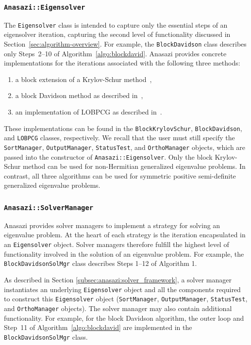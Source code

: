 \documentclass[acmtoms,acmnow]{acmtrans2m}
\newcommand{\aspace}[1]{\texttt{#1}}
\begin{document}
\subsubsection{\aspace{Anasazi::Eigensolver}}

The \aspace{Eigensolver} class is intended to capture only the essential steps of an
eigensolver iteration, capturing the second level of functionality discussed in
Section~\ref{sec:algorithm-overview}. 
For example, the \aspace{BlockDavidson} class
describes only Steps~2--10 of Algorithm~\ref{algo:blockdavid}.  
Anasazi provides concrete
implementations for the iterations associated with the following three methods:
\begin{enumerate}
  \item a block extension of a Krylov-Schur method~\cite{stew:01},
  \item a block Davidson method as described in~\cite{Arbenz:2005:ACE},
  \item an implementation of LOBPCG as described in~\cite{Hetmaniuk:2006:BSL}.
\end{enumerate}
These implementations can be found in the \aspace{BlockKrylovSchur},
\aspace{BlockDavidson}, and \aspace{LOBPCG} classes, respectively. We recall that the
user must still specify the \aspace{SortManager}, \aspace{OutputManager},
\aspace{StatusTest}, and \aspace{OrthoManager} objects, which are passed into the
constructor of \aspace{Anasazi::Eigensolver}. Only the block Krylov-Schur method can be
used for non-Hermitian generalized eigenvalue problems. In contrast, all three algorithms
can be used for symmetric positive semi-definite generalized eigenvalue problems. 


\subsubsection{\aspace{Anasazi::SolverManager}}

Anasazi provides solver managers to implement a strategy for solving an eigenvalue
problem. At the heart of each strategy is the iteration encapsulated in an
\aspace{Eigensolver} object. Solver managers therefore fulfill the highest level of
functionality involved in the solution of an eigenvalue problem. 
For example, the \aspace{BlockDavidsonSolMgr} class describes
Steps 1--12 of Algorithm 1. 

As described in Section \ref{subsec:anasazi:solver_framework}, a solver manager
instantiates an underlying \aspace{Eigen\-solver} object and all the components required
to construct this \aspace{Eigen\-solver} object (\aspace{Sort\-Manager},
\aspace{Output\-Manager}, \aspace{Status\-Test}, and \aspace{Ortho\-Manager} objects).
The solver manager may also contain additional functionality.  For example, for the block
Davidson algorithm, the outer loop and Step~11 of Algorithm~\ref{algo:blockdavid} are
implemented in the \aspace{BlockDavidsonSolMgr} class.
\end{document}
